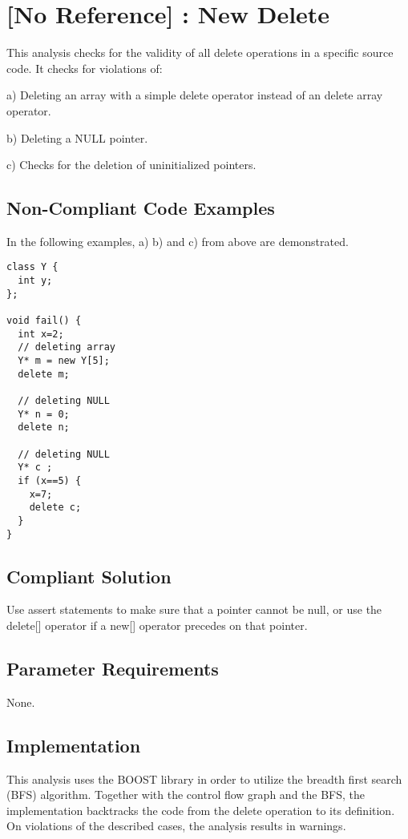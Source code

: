 \section{[No Reference] : New Delete}

This analysis checks for the validity of all delete operations in a specific source code.
It checks for violations of:

a) Deleting an array with a simple delete operator instead of an delete array operator.

b) Deleting a NULL pointer.

c) Checks for the deletion of uninitialized pointers.


\subsection{Non-Compliant Code Examples}

In the following examples, a) b) and c) from above are demonstrated.

\begin{verbatim}
class Y {
  int y;
};

void fail() {
  int x=2;
  // deleting array
  Y* m = new Y[5];
  delete m;

  // deleting NULL
  Y* n = 0;
  delete n;

  // deleting NULL
  Y* c ;
  if (x==5) {
    x=7;
    delete c;
  }
}
\end{verbatim}

\subsection{Compliant Solution}
Use assert statements to make sure that a pointer cannot be null,
or use the delete[] operator if a new[] operator precedes on that pointer. 

\subsection{Parameter Requirements}

None.


\subsection{Implementation}

This analysis uses the BOOST library in order to utilize the breadth first search (BFS) algorithm.
Together with the control flow graph and the BFS, the implementation backtracks the code from the
delete operation to its definition. On violations of the described cases, the analysis results in warnings.

